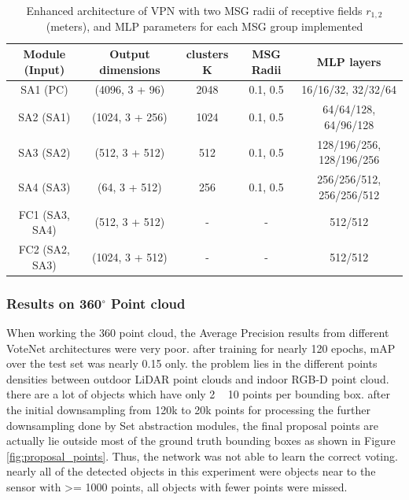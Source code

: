\documentclass[10pt,twocolumn,letterpaper]{article}
\begin{document}
\begin{table}
\label{tab:votenet_msg}
\begin{center}
\begin{tabular}{|c|c|c|c|c|}
\hline
Module (Input) & Output dimensions & clusters K & MSG Radii & MLP layers \\
\hline\hline
SA1 (PC) & (4096, 3 + 96) & 2048 & 0.1,  0.5 & 16/16/32, 32/32/64 \\
SA2 (SA1) & (1024, 3 + 256) & 1024 & 0.1,  0.5 & 64/64/128,  64/96/128 \\
SA3 (SA2) & (512, 3 + 512) & 512 & 0.1,  0.5 & 128/196/256,  128/196/256 \\
SA4 (SA3) & (64, 3 + 512) & 256 & 0.1,  0.5 & 256/256/512,  256/256/512 \\
FC1 (SA3, SA4) & (512, 3 + 512) & - & - & 512/512 \\
FC2 (SA2, SA3) & (1024, 3 + 512) & - & - & 512/512 \\
\hline
\end{tabular}
\end{center}
\caption{Enhanced architecture of VPN with two MSG radii of receptive fields $r_{1,2}$ (meters), and MLP parameters for each MSG group implemented \cite{RCNN paper}}
\end{table}

\subsubsection{Results on 360$^{\circ}$ Point cloud}
When working the 360 point cloud, the Average Precision results from different VoteNet architectures were very poor. after training for nearly 120 epochs, mAP over the test set was nearly 0.15 only. the problem lies in the different points densities between outdoor LiDAR point clouds and  indoor RGB-D point cloud. there are a lot of objects which have only 2 ~ 10 points per bounding box. after the initial downsampling from 120k to 20k points for processing the further downsampling done by Set abstraction modules, the final proposal points are actually lie outside most of the ground truth bounding boxes as shown in Figure \ref{fig:proposal_points}. Thus, the network was not able to learn the correct voting. nearly all of the detected objects in this experiment were objects near to the sensor with >= 1000 points, all objects with fewer points were missed.
\end{document}
